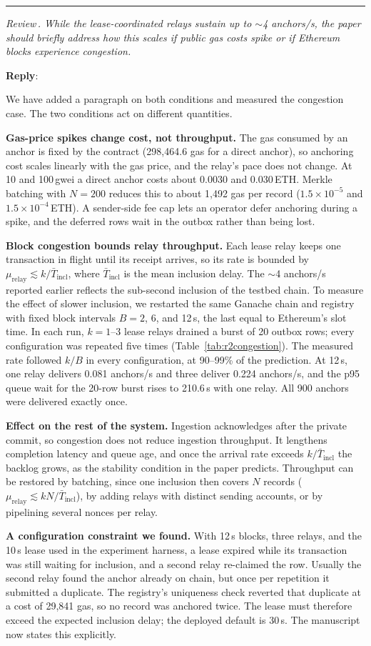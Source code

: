 \documentclass[11pt]{article}
\newcounter{reviewer}
\newcounter{point}[reviewer]
\renewcommand{\thepoint}{Review\,\thereviewer.\arabic{point}}
\newcommand{\point}[1]{\refstepcounter{point}  \bigskip \hrule \medskip \noindent \textit{{\fontseries{b}\selectfont \thepoint } #1}\par}
\newcommand{\reply}{\medskip \noindent \textbf{Reply}:\ }
\begin{document}
\point{While the lease-coordinated relays sustain up to $\sim$4 anchors/s, the paper should briefly address how this scales if public gas costs spike or if Ethereum blocks experience congestion.}

\reply{We have added a paragraph on both conditions and measured the congestion case. The two conditions act on different quantities.

\textbf{Gas-price spikes change cost, not throughput.} The gas consumed by an anchor is fixed by the contract (298{,}464.6 gas for a direct anchor), so anchoring cost scales linearly with the gas price, and the relay's pace does not change. At 10 and 100\,gwei a direct anchor costs about 0.0030 and 0.030\,ETH. Merkle batching with $N=200$ reduces this to about 1{,}492 gas per record ($1.5\times10^{-5}$ and $1.5\times10^{-4}$\,ETH). A sender-side fee cap lets an operator defer anchoring during a spike, and the deferred rows wait in the outbox rather than being lost.

\textbf{Block congestion bounds relay throughput.} Each lease relay keeps one transaction in flight until its receipt arrives, so its rate is bounded by $\mu_{\mathrm{relay}}\lesssim k/\bar{T}_{\mathrm{incl}}$, where $\bar{T}_{\mathrm{incl}}$ is the mean inclusion delay. The $\sim$4 anchors/s reported earlier reflects the sub-second inclusion of the testbed chain. To measure the effect of slower inclusion, we restarted the same Ganache chain and registry with fixed block intervals $B=2$, 6, and 12\,s, the last equal to Ethereum's slot time. In each run, $k=1$--3 lease relays drained a burst of 20 outbox rows; every configuration was repeated five times (Table~\ref{tab:r2congestion}). The measured rate followed $k/B$ in every configuration, at 90--99\% of the prediction. At 12\,s, one relay delivers 0.081 anchors/s and three deliver 0.224 anchors/s, and the p95 queue wait for the 20-row burst rises to 210.6\,s with one relay. All 900 anchors were delivered exactly once.

\textbf{Effect on the rest of the system.} Ingestion acknowledges after the private commit, so congestion does not reduce ingestion throughput. It lengthens completion latency and queue age, and once the arrival rate exceeds $k/\bar{T}_{\mathrm{incl}}$ the backlog grows, as the stability condition in the paper predicts. Throughput can be restored by batching, since one inclusion then covers $N$ records ($\mu_{\mathrm{relay}}\lesssim kN/\bar{T}_{\mathrm{incl}}$), by adding relays with distinct sending accounts, or by pipelining several nonces per relay.

\textbf{A configuration constraint we found.} With 12\,s blocks, three relays, and the 10\,s lease used in the experiment harness, a lease expired while its transaction was still waiting for inclusion, and a second relay re-claimed the row. Usually the second relay found the anchor already on chain, but once per repetition it submitted a duplicate. The registry's uniqueness check reverted that duplicate at a cost of 29{,}841 gas, so no record was anchored twice. The lease must therefore exceed the expected inclusion delay; the deployed default is 30\,s. The manuscript now states this explicitly.}
\end{document}

